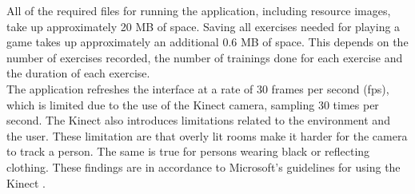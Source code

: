 All of the required files for running the application, including resource images, take up approximately 20 MB of space. Saving all exercises needed for playing a game takes up approximately an additional 0.6 MB of space. This depends on the number of exercises recorded, the number of trainings done for each exercise and the duration of each exercise.\\

The application refreshes the interface at a rate of 30 frames per second (fps), which is limited due to the use of the Kinect camera, sampling 30 times per second. The Kinect also introduces limitations related to the environment and the user. These limitation are that overly lit rooms make it harder for the camera to track a person. The same is true for persons wearing black or reflecting clothing. These findings are in accordance to Microsoft's guidelines for using the Kinect \cite{MicrosoftGuidelines}.